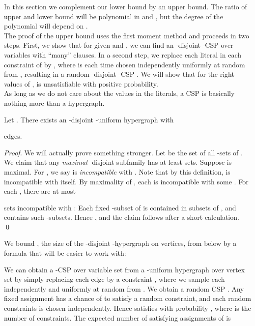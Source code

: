 \documentclass[envcountsect, envcountsame]{llncs}
\begin{document}
In this section we complement our lower bound by an upper bound. The
ratio of upper and lower bound will be polynomial in  and , but
the degree of the polynomial will depend on .  \\

The proof of the upper bound uses the first moment method and proceeds
in two steps. First, we show that for given  and , we
can find an -disjoint -CSP  over  variables with
``many'' clauses. In a second step, we replace each literal 
in each constraint of  by , where  is each time
chosen independently uniformly at random from ,
resulting in a random -disjoint -CSP .  We will show
that for the right values of ,  is unsatisfiable with positive
probability.\\

As long as we do not care about the values  in the literals, a CSP
is basically nothing more than a hypergraph.

\begin{lemma}
  Let . There exists an -disjoint
  -uniform hypergraph with

edges.
\label{large-hypergraph}
\end{lemma}

\begin{proof}
  We will actually prove something stronger. Let  be the
  set of all -sets of . We claim that any {\em
    maximal} -disjoint subfamily  has at least  sets. Suppose  is maximal. For , we say  is
  {\em incompatible} with  . Note that by
  this definition,  is incompatible with itself.  By maximality of
  , each  is incompatible with some . For each , there are at most
  
  sets  incompatible with : Each fixed
  -subset of  is contained in 
  subsets of , and  contains  such
  -subsets.  Hence , and the claim follows after a short
  calculation.  \qed
\end{proof}

We bound , the size of the -disjoint -hypergraph on
 vertices, from below by a formula that will be easier to work with:


We can obtain a -CSP over variable set 
from a -uniform hypergraph over vertex set  by
simply replacing each edge  by a constraint
, where we sample each 
independently and uniformly at random from . We
obtain a random CSP . Any fixed assignment  has a chance of
 to satisfy a random constraint, and each random constraints
is chosen independently. Hence  satisfies  with probability
, where  is the number of constraints.
The expected number of satisfying assignments of  is
\end{document}

